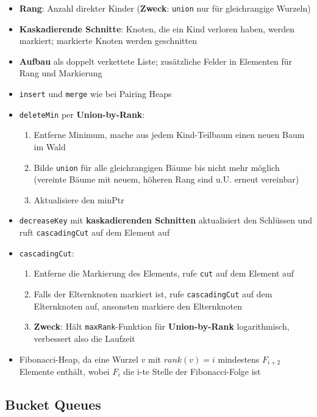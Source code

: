\documentclass[10pt,a4paper]{article}
\begin{document}
  	\begin{itemize}
		\item \textbf{Rang}: Anzahl direkter Kinder (\textbf{Zweck}: \texttt{union} nur für gleichrangige Wurzeln)
		\item \textbf{Kaskadierende Schnitte}: Knoten, die ein Kind verloren haben, werden markiert; markierte Knoten werden geschnitten
		\item \textbf{Aufbau} als doppelt verkettete Liste; zusätzliche Felder in Elementen für Rang und Markierung
		\item \texttt{insert} und \texttt{merge} wie bei Pairing Heaps
		\item \texttt{deleteMin} per \textbf{Union-by-Rank}:
		\begin{enumerate}
			\item Entferne Minimum, mache aus jedem Kind-Teilbaum einen neuen Baum im Wald
			\item Bilde \texttt{union} für alle gleichrangigen Bäume bis nicht mehr möglich (vereinte Bäume mit neuem, höheren Rang sind u.U. erneut vereinbar)
			\item Aktualisiere den minPtr
		\end{enumerate}
		\item \texttt{decreaseKey} mit \textbf{kaskadierenden Schnitten} aktualisiert den Schlüssen und ruft \texttt{cascadingCut} auf dem Element auf
		\item \texttt{cascadingCut}:
		\begin{enumerate}
			\item Entferne die Markierung des Elements, rufe \texttt{cut} auf dem Element auf
			\item Falls der Elternknoten markiert ist, rufe \texttt{cascadingCut} auf dem Elternknoten auf, ansonsten markiere den Elternknoten
			\item \textbf{Zweck}: Hält \texttt{maxRank}-Funktion für \textbf{Union-by-Rank} logarithmisch, verbessert also die Laufzeit
		\end{enumerate}
		\item Fibonacci-Heap, da eine Wurzel $v$ mit $rank(v) = i$ mindestens $F_{i + 2}$ Elemente enthält, wobei $F_i$ die i-te Stelle der Fibonacci-Folge ist
  	\end{itemize}

  	\subsection{Bucket Queues}
  	\label{pl:sub:bucket_queues}
  	
\end{document}

